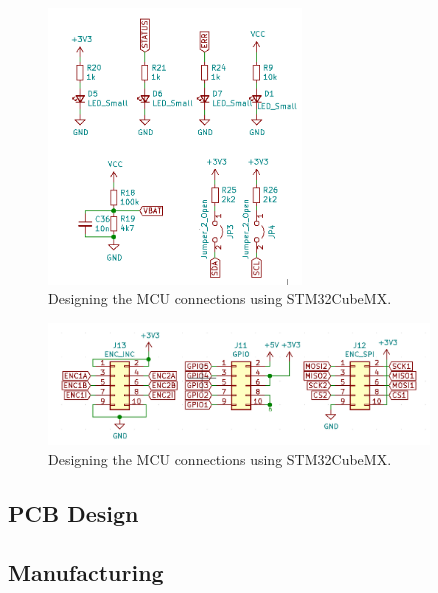 \begin{figure}[H]
    \centering
    \includegraphics[width=0.6\textwidth]{obrazky/schem_aux}
    \caption{Designing the MCU connections using STM32CubeMX.}
    \label{fig:schem_aux}
\end{figure}


\begin{figure}[H]
    \centering
    \includegraphics[width=0.9\textwidth]{obrazky/schem_enc_gpio}
    \caption{Designing the MCU connections using STM32CubeMX.}
    \label{fig:schem_enc_gpio}
\end{figure}

\subsection{PCB Design}
\label{subsec:pcb_design}

\subsection{Manufacturing}
\label{subsec:manufacturing}

